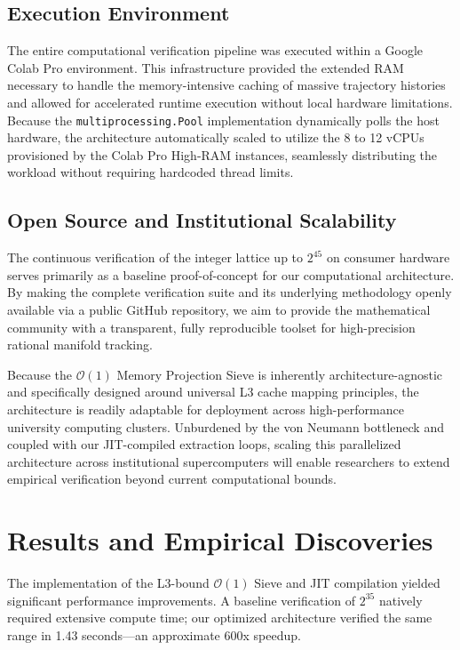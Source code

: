 \documentclass[11pt, a4paper]{article}
\theoremstyle{definition}
\begin{document}
\subsection{Execution Environment}
The entire computational verification pipeline was executed within a Google Colab Pro environment. This infrastructure provided the extended RAM necessary to handle the memory-intensive caching of massive trajectory histories and allowed for accelerated runtime execution without local hardware limitations. Because the \texttt{multiprocessing.Pool} implementation dynamically polls the host hardware, the architecture automatically scaled to utilize the 8 to 12 vCPUs provisioned by the Colab Pro High-RAM instances, seamlessly distributing the workload without requiring hardcoded thread limits.

\subsection{Open Source and Institutional Scalability}
The continuous verification of the integer lattice up to $2^{45}$ on consumer hardware serves primarily as a baseline proof-of-concept for our computational architecture. By making the complete verification suite and its underlying methodology openly available via a public GitHub repository, we aim to provide the mathematical community with a transparent, fully reproducible toolset for high-precision rational manifold tracking.

Because the $\mathcal{O}(1)$ Memory Projection Sieve is inherently architecture-agnostic and specifically designed around universal L3 cache mapping principles, the architecture is readily adaptable for deployment across high-performance university computing clusters. Unburdened by the von Neumann bottleneck and coupled with our JIT-compiled extraction loops, scaling this parallelized architecture across institutional supercomputers will enable researchers to extend empirical verification beyond current computational bounds.

\section{Results and Empirical Discoveries}

The implementation of the L3-bound $\mathcal{O}(1)$ Sieve and JIT compilation yielded significant performance improvements. A baseline verification of $2^{35}$ natively required extensive compute time; our optimized architecture verified the same range in 1.43 seconds---an approximate 600x speedup.
\end{document}
